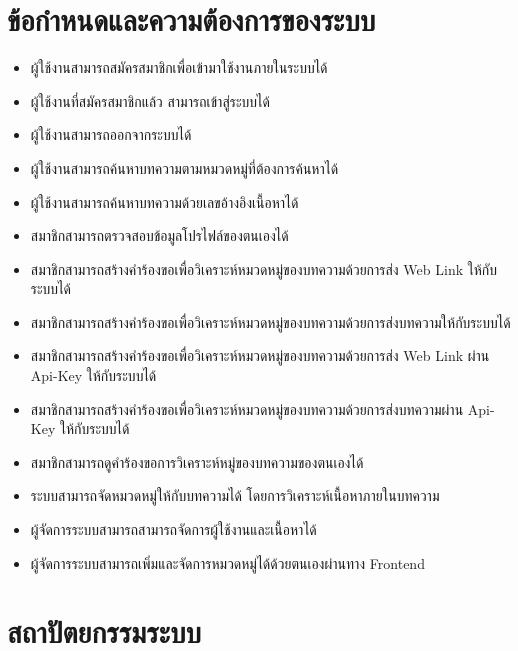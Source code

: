 \documentclass[12pt,oneside,openright,a4paper]{cpe-thai-project}
\begin{document}
\section{ข้อกำหนดและความต้องการของระบบ}
\begin{itemize}
  \item ผู้ใช้งานสามารถสมัครสมาชิกเพื่อเข้ามาใช้งานภายในระบบได้
  \item ผู้ใช้งานที่สมัครสมาชิกแล้ว สามารถเข้าสู่ระบบได้
  \item ผู้ใช้งานสามารถออกจากระบบได้
  \item ผู้ใช้งานสามารถค้นหาบทความตามหมวดหมู่ที่ต้องการค้นหาได้
  \item ผู้ใช้งานสามารถค้นหาบทความด้วยเลขอ้างอิงเนื้อหาได้
  \item สมาชิกสามารถตรวจสอบข้อมูลโปรไฟล์ของตนเองได้
  \item สมาชิกสามารถสร้างคำร้องขอเพื่อวิเคราะห์หมวดหมู่ของบทความด้วยการส่ง Web Link ให้กับระบบได้
  \item สมาชิกสามารถสร้างคำร้องขอเพื่อวิเคราะห์หมวดหมู่ของบทความด้วยการส่งบทความให้กับระบบได้
  \item สมาชิกสามารถสร้างคำร้องขอเพื่อวิเคราะห์หมวดหมู่ของบทความด้วยการส่ง Web Link ผ่าน Api-Key ให้กับระบบได้
  \item สมาชิกสามารถสร้างคำร้องขอเพื่อวิเคราะห์หมวดหมู่ของบทความด้วยการส่งบทความผ่าน Api-Key ให้กับระบบได้
  \item สมาชิกสามารถดูคำร้องขอการวิเคราะห์หมู่ของบทความของตนเองได้
  \item ระบบสามารถจัดหมวดหมู่ให้กับบทความได้ โดยการวิเคราะห์เนื้อหาภายในบทความ 
  \item ผู้จัดการระบบสามารถสามารถจัดการผู้ใช้งานและเนื้อหาได้
  \item ผู้จัดการระบบสามารถเพิ่มและจัดการหมวดหมู่ได้ด้วยตนเองผ่านทาง Frontend
\end{itemize}

\section{สถาปัตยกรรมระบบ}
\end{document}
